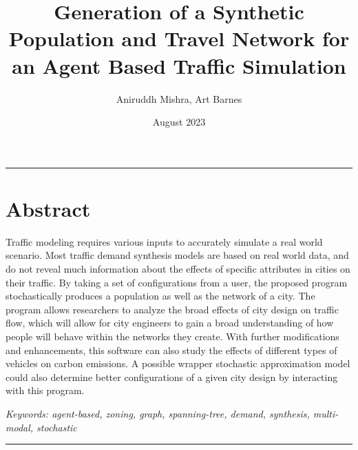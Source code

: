 \documentclass[11pt]{article}
\title{\vspace{-5em}\Huge Generation of a Synthetic Population and Travel Network for an Agent Based Traffic Simulation}
\author{\small Aniruddh Mishra, Art Barnes}
\affil{\textit{Institute for Computing in Research}}
\date{\vspace{-0.9em}\small August 2023}
\begin{document}
\maketitle

\hrule

\section*{Abstract}

\quad Traffic modeling requires various inputs to accurately simulate a real world scenario. Most traffic demand synthesis models are based on real world data, and do not reveal much information about the effects of specific attributes in cities on their traffic. By taking a set of configurations from a user, the proposed program stochastically produces a population as well as the network of a city. The program allows researchers to analyze the broad effects of city design on traffic flow, which will allow for city engineers to gain a broad understanding of how people will behave within the networks they create. With further modifications and enhancements, this software can also study the effects of different types of vehicles on carbon emissions. A possible wrapper stochastic approximation model could also determine better configurations of a given city design by interacting with this program.

\vspace{1em}

\raggedright\textit{Keywords: agent-based, zoning, graph, spanning-tree, demand, synthesis, multi-modal, stochastic}

\vspace{1em}

\hrule

\vspace{0.7em}
\end{document}
